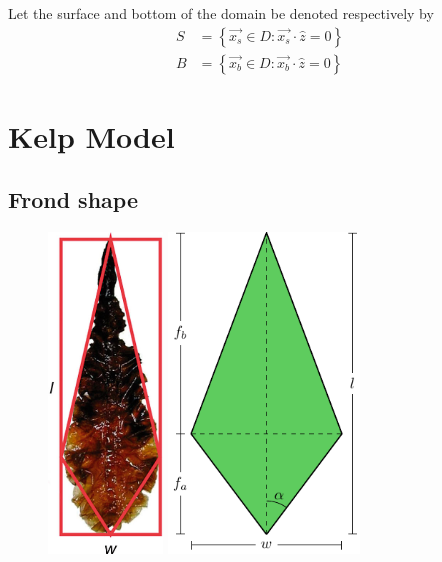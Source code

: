 Let the surface and bottom of the domain be denoted respectively by
\begin{align}
  S &= \left\{\vec{x_s} \in D: \vec{x_s} \cdot \hat{z} = 0 \right\} \\
  B &= \left\{\vec{x_b} \in D: \vec{x_b} \cdot \hat{z} = 0 \right\}
\end{align}

\section{Kelp Model}

\subsection{Frond shape}
\label{sec:shape}


\begin{figure}[h]
	\centering
  \includegraphics[width=1.2in]{kelp_photo/kite}
  \qquad
	\includegraphics[width=2in]{frond}
	\label{fig:frond}
\end{figure}

